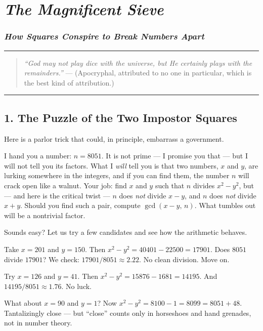 \chapter{\texorpdfstring{\emph{The Magnificent Sieve}}{The Magnificent Sieve}}
\subsection{\texorpdfstring{\emph{How Squares Conspire to Break Numbers Apart}}{How Squares Conspire to Break Numbers Apart}}
\bigskip\noindent\rule{\linewidth}{0.4pt}\bigskip

\begin{quote}
\emph{``God may not play dice with the universe, but He certainly plays with the remainders.''} --- (Apocryphal, attributed to no one in particular, which is the best kind of attribution.)
\end{quote}

\bigskip\noindent\rule{\linewidth}{0.4pt}\bigskip

\section{1. The Puzzle of the Two Impostor Squares}
Here is a parlor trick that could, in principle, embarrass a government.

I hand you a number: \(n = 8051\). It is not prime --- I promise you that --- but I will not tell you its factors. What I \emph{will} tell you is that two numbers, \(x\) and \(y\), are lurking somewhere in the integers, and if you can find them, the number \(n\) will crack open like a walnut. Your job: find \(x\) and \(y\) such that \(n\) divides \(x^2 - y^2\), but --- and here is the critical twist --- \(n\) does \emph{not} divide \(x - y\), and \(n\) does \emph{not} divide \(x + y\). Should you find such a pair, compute \(\gcd(x - y, \, n)\). What tumbles out will be a nontrivial factor.

Sounds easy? Let us try a few candidates and see how the arithmetic behaves.

Take \(x = 201\) and \(y = 150\). Then \(x^2 - y^2 = 40401 - 22500 = 17901\). Does \(8051\) divide \(17901\)? We check: \(17901 / 8051 \approx 2.22\). No clean division. Move on.

Try \(x = 126\) and \(y = 41\). Then \(x^2 - y^2 = 15876 - 1681 = 14195\). And \(14195 / 8051 \approx 1.76\). No luck.

What about \(x = 90\) and \(y = 1\)? Now \(x^2 - y^2 = 8100 - 1 = 8099 = 8051 + 48\). Tantalizingly close --- but ``close'' counts only in horseshoes and hand grenades, not in number theory.

